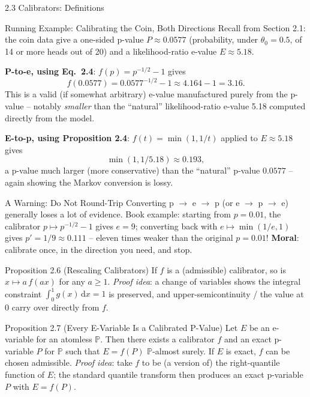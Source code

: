 \documentclass[aspectratio=169,10pt]{beamer}
\newcommand{\PP}{\mathbb{P}}
\begin{document}
\begin{frame}[allowframebreaks]{2.3 Calibrators: Definitions}
  \framebreak

  \begin{exampleblock}{Running Example: Calibrating the Coin, Both Directions}
    Recall from Section 2.1: the coin data give a one-sided p-value
    $P \approx 0.0577$ (probability, under $\theta_0=0.5$, of 14 or more
    heads out of 20) and a likelihood-ratio e-value $E\approx 5.18$.

    \medskip
    \textbf{P-to-e, using Eq.~2.4}: $f(p)=p^{-1/2}-1$ gives
    \[
      f(0.0577) = 0.0577^{-1/2} - 1 \approx 4.164 - 1 = 3.16.
    \]
    This is a valid (if somewhat arbitrary) e-value manufactured purely
    from the p-value -- notably \emph{smaller} than the ``natural''
    likelihood-ratio e-value 5.18 computed directly from the model.

    \medskip
    \textbf{E-to-p, using Proposition 2.4}: $f(t)=\min(1,1/t)$ applied to
    $E\approx5.18$ gives
    \[
      \min(1, 1/5.18) \approx 0.193,
    \]
    a p-value much larger (more conservative) than the ``natural'' p-value
    $0.0577$ -- again showing the Markov conversion is lossy.
  \end{exampleblock}

  \framebreak

  \begin{alertblock}{A Warning: Do Not Round-Trip}
    Converting p $\to$ e $\to$ p (or e $\to$ p $\to$ e) generally loses a
    lot of evidence. Book example: starting from $p=0.01$, the calibrator
    $p\mapsto p^{-1/2}-1$ gives $e=9$; converting back with
    $e\mapsto\min(1/e,1)$ gives $p'=1/9\approx0.111$ -- eleven times
    weaker than the original $p=0.01$! \textbf{Moral}: calibrate once, in
    the direction you need, and stop.
  \end{alertblock}

  \begin{block}{Proposition 2.6 (Rescaling Calibrators)}
    If $f$ is a (admissible) calibrator, so is $x\mapsto a\,f(ax)$ for any
    $a\ge1$. \emph{Proof idea}: a change of variables shows the integral
    constraint $\int_0^1 g(x)\,\mathrm{d}x=1$ is preserved, and
    upper-semicontinuity / the value at 0 carry over directly from $f$.
  \end{block}

  \begin{block}{Proposition 2.7 (Every E-Variable Is a Calibrated P-Value)}
    Let $E$ be an e-variable for an atomless $\PP$. Then there exists a
    calibrator $f$ and an exact p-variable $P$ for $\PP$ such that
    $E=f(P)$ $\PP$-almost surely. If $E$ is exact, $f$ can be chosen
    admissible. \emph{Proof idea}: take $f$ to be (a version of) the
    right-quantile function of $E$; the standard quantile transform then
    produces an exact p-variable $P$ with $E=f(P)$.
  \end{block}


\end{frame}
\end{document}
